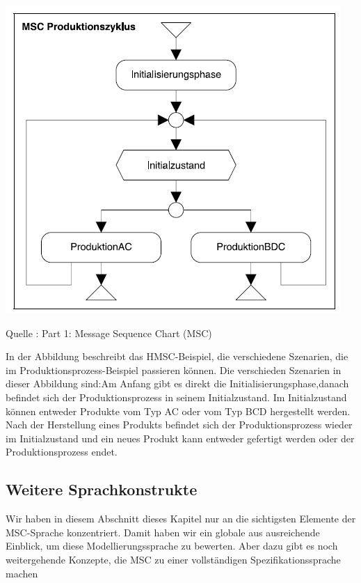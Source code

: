 \includegraphics[scale=1]{Graphics/HMSC.jpg}



Quelle : \cite{MT009}
Part 1: Message Sequence Chart (MSC) 

 

In der Abbildung beschreibt das HMSC-Beispiel, die verschiedene Szenarien, die im Produktionsprozess-Beispiel passieren können. 
Die verschieden Szenarien in dieser Abbildung sind:Am Anfang gibt es direkt die Initialisierungsphase,danach
befindet sich der Produktionsprozess in seinem
Initialzustand. Im Initialzustand können entweder Produkte
vom Typ AC oder vom Typ BCD hergestellt werden. Nach
der Herstellung eines Produkts befindet sich der Produktionsprozess
wieder im Initialzustand und ein neues Produkt
kann entweder gefertigt werden oder der Produktionsprozess endet.

\subsection{Weitere Sprachkonstrukte}
Wir haben in diesem Abschnitt dieses Kapitel nur an die sichtigsten Elemente der MSC-Sprache konzentriert. Damit haben wir ein globale aus ausreichende Einblick, um diese Modellierungssprache zu bewerten. Aber dazu gibt es noch weitergehende Konzepte, die MSC zu einer vollständigen Spezifikationssprache machen






